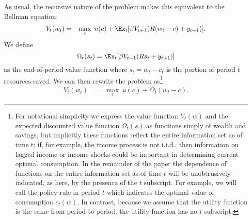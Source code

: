 As usual, the recursive nature of the problem makes this equivalent to the Bellman equation:
\begin{eqnarray*}  \label{eq:recursiveV}
V_{t}(w_{t}) & = & \max_{c} ~ u(c) + \Ex_{t} [{\beta}
V_{t+1}(%
{R}(w_t - c) + {y}_{t+1})].
\end{eqnarray*}
We define
\begin{equation*} \label{eq:OmegaEV}
\Omega_t(s_t) = \Ex_t [ \beta V_{t+1}(R s_t + y_{t+1})]
\end{equation*}
as the end-of-period value function where $s_t = w_t - c_t$ is the portion of period t resources saved. We can then rewrite the problem as\footnote{For notational simplicity we express the value function $V_t(w)$ and the expected discounted value function $\Omega_{t}(s)$ as functions simply of wealth and savings, but implicitly these functions reflect the entire information set as of time t; if, for example, the income process is not i.i.d., then information on lagged income or income shocks could be important in determining current optimal consumption.  In the remainder of the paper the dependence of functions on the entire information set as of time $t$ will be unobtrusively indicated, as here, by the presence of the $t$ subscript. For example, we will call the policy rule in period $t$ which indicates the optimal value of consumption $c_{t}(w)$. In contrast, because we assume that the utility function is the same from period to period, the utility function has no $t$ subscript.}
\begin{eqnarray*}  \label{eq:subphi}
V_{t}(w_{t}) & = & \max_{c} ~ u(c) + \Omega_{t}(w_t - c).
\end{eqnarray*}

